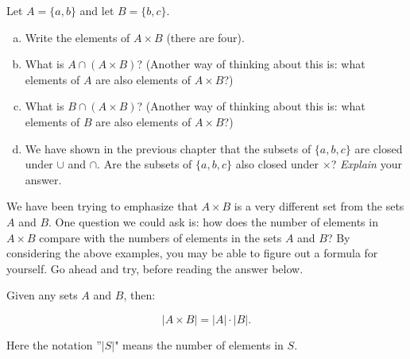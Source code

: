 \begin{exercise}{}
Let $A = \{a,b\}$ and let $B = \{b,c\}$.
\begin{enumerate}[(a)]
\item
Write the elements of $A \times B$ (there are four).
\item 
What is $A \cap (A \times B)$? (Another way of thinking about this is: what elements of $A$ are also elements of $A \times B$?)
\item 
What is $B \cap (A \times B)$? (Another way of thinking about this is: what elements of $B$ are also elements of $A \times B$?)
\item
We have shown in the previous chapter that the subsets of $\{a,b,c\}$ are closed under $\cup$ and $\cap$. Are the subsets of $\{a,b,c\}$ also closed under $\times$? \emph{Explain} your answer.
\end{enumerate}
\end{exercise}

We have been trying to emphasize that $A \times B$ is a very different set from the sets $A$ and $B$.  One question we could ask is: how does the number of elements in $A \times B$ compare with the numbers of elements in the sets $A$ and $B$?  By considering the above examples, you may be able to figure out a formula for yourself.  Go ahead and try, before reading the answer below.

\begin{prop}{}
Given any sets $A$ and $B$, then:

\[  |A \times B|= |A| \cdot |B|. \]

Here the notation ''$|S|$" means the number of elements in $S$.
\end{prop}

